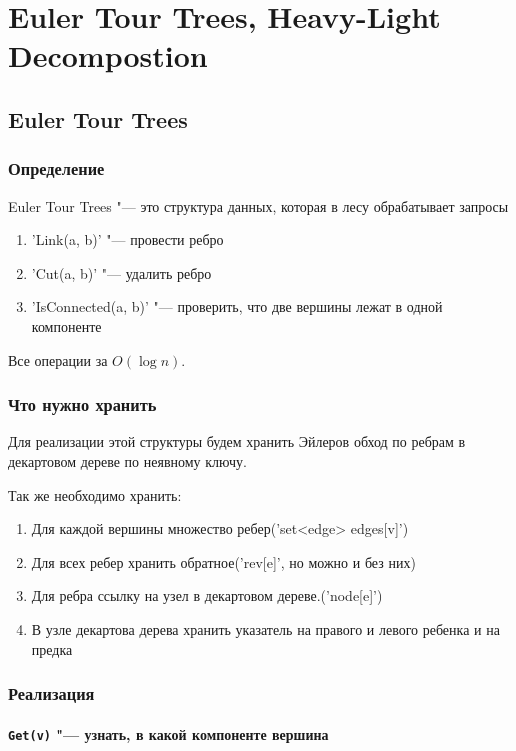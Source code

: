 ﻿\chapter{Euler Tour Trees, Heavy-Light Decompostion}

\section{Euler Tour Trees}
\subsection{Определение}
Euler Tour Trees "--- это структура данных, которая в лесу обрабатывает запросы
\begin{enumerate}
	\item \cpp'Link(a, b)' "--- провести ребро
	\item \cpp'Cut(a, b)' "--- удалить ребро
	\item \cpp'IsConnected(a, b)' "--- проверить, что две вершины лежат в одной компоненте
\end{enumerate}
Все операции за $O(\log n)$.

\subsection{Что нужно хранить}

Для реализации этой структуры будем хранить Эйлеров обход по ребрам в декартовом дереве по неявному ключу.


Так же необходимо хранить:
\begin{enumerate}
	\item Для каждой вершины множество ребер(\cpp'set<edge> edges[v]')
	\item Для всех ребер хранить обратное(\cpp'rev[e]', но можно и без них)
	\item Для ребра ссылку на узел в декартовом дереве.(\cpp'node[e]')
	\item В узле декартова дерева хранить указатель на правого и левого ребенка и на предка
\end{enumerate}

\subsection{Реализация}

\subsubsection{\texttt{Get(v)} "--- узнать, в какой компоненте вершина}

